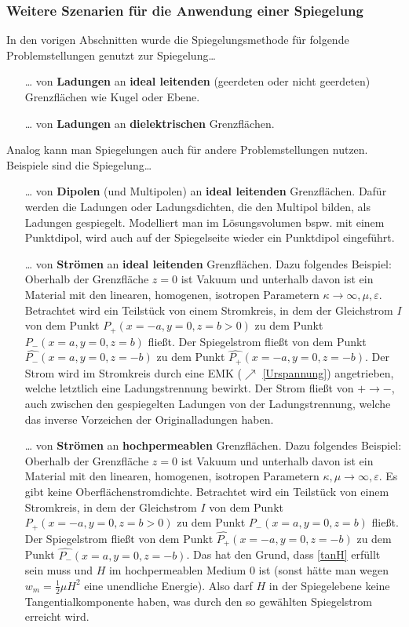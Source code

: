 	  	\subsubsection{Weitere Szenarien für die Anwendung einer Spiegelung}
	  	In den vorigen Abschnitten wurde die Spiegelungsmethode für folgende Problemstellungen genutzt zur Spiegelung\dots
	  	\begin{itemize}
	  	\item[\dots] von \textbf{Ladungen} an \textbf{ideal leitenden} (geerdeten oder nicht geerdeten) Grenzflächen wie Kugel oder Ebene.
	  	\item[\dots] von \textbf{Ladungen} an \textbf{dielektrischen} Grenzflächen.
	  	\end{itemize}
	  	Analog kann man Spiegelungen auch für andere Problemstellungen nutzen. Beispiele sind die Spiegelung\dots
	  	\begin{itemize}
	  		\item[\dots] von \textbf{Dipolen} (und Multipolen) an \textbf{ideal leitenden} Grenzflächen. Dafür werden die Ladungen oder Ladungsdichten, die den Multipol bilden, als Ladungen gespiegelt. Modelliert man im Lösungsvolumen bspw. mit einem Punktdipol, wird auch auf der Spiegelseite wieder ein Punktdipol eingeführt.
	  		\item[\dots] von \textbf{Strömen} an \textbf{ideal leitenden} Grenzflächen. Dazu folgendes Beispiel: Oberhalb der Grenzfläche $z = 0$ ist Vakuum und unterhalb davon ist ein Material mit den linearen, homogenen, isotropen Parametern $\kappa\to\infty,\mu,\varepsilon$. Betrachtet wird ein Teilstück von einem Stromkreis, in dem der Gleichstrom $I$ von dem Punkt $P_+ (x = -a, y = 0, z = b > 0)$ zu dem Punkt $P_- (x = a, y = 0, z = b)$ fließt. Der Spiegelstrom fließt von dem Punkt $\hat{P_-}(x = a, y = 0, z = −b)$ zu dem Punkt $\hat{P_+}(x = -a, y =
	  		0, z = −b)$. Der Strom wird im Stromkreis durch eine EMK ($\nearrow$ \ref{Urspannung}) angetrieben, welche letztlich eine Ladungstrennung bewirkt. Der Strom fließt von $+\to -$, auch zwischen den gespiegelten Ladungen von der Ladungstrennung, welche das inverse Vorzeichen der Originalladungen haben.
	  		\item[\dots] von \textbf{Strömen} an \textbf{hochpermeablen} Grenzflächen. Dazu folgendes Beispiel: Oberhalb der Grenzfläche $z = 0$ ist Vakuum und unterhalb davon ist ein Material mit den linearen, homogenen, isotropen Parametern $\kappa,\mu\to\infty,\varepsilon$. Es gibt keine Oberflächenstromdichte. Betrachtet wird ein Teilstück von einem Stromkreis, in dem der Gleichstrom $I$ von dem Punkt $P_+ (x = -a, y = 0, z = b > 0)$ zu dem Punkt $P_- (x = a, y = 0, z = b)$ fließt. Der Spiegelstrom fließt von dem Punkt $\hat{P_+}(x = -a, y =
	  		0, z = −b)$ zu dem Punkt $\hat{P_-}(x = a, y = 0, z = −b)$. Das hat den Grund, dass \ref{tanH} erfüllt sein muss und $H$ im hochpermeablen Medium 0 ist (sonst hätte man wegen $w_m=\frac{1}{2}\mu H^2$ eine unendliche Energie). Also darf $H$ in der Spiegelebene keine Tangentialkomponente haben, was durch den so gewählten Spiegelstrom erreicht wird.
	  	\end{itemize}
